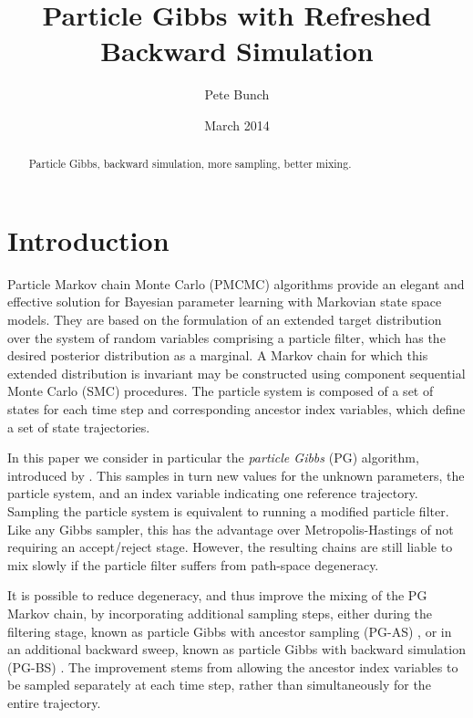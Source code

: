 \documentclass{article}
\title{Particle Gibbs with Refreshed Backward Simulation}
\author{Pete Bunch}
\date{March 2014}
\begin{document}
\maketitle

\begin{abstract}
 Particle Gibbs, backward simulation, more sampling, better mixing.
\end{abstract}


\section{Introduction}
Particle Markov chain Monte Carlo (PMCMC) algorithms \cite{Andrieu2010,Olsson2011,Chopin2013,Lindsten2014} provide an elegant and effective solution for Bayesian parameter learning with Markovian state space models. They are based on the formulation of an extended target distribution over the system of random variables comprising a particle filter, which has the desired posterior distribution as a marginal. A Markov chain for which this extended distribution is invariant may be constructed using component sequential Monte Carlo (SMC) procedures. The particle system is composed of a set of states for each time step and corresponding ancestor index variables, which define a set of state trajectories.

In this paper we consider in particular the \emph{particle Gibbs} (PG) algorithm, introduced by \cite{Andrieu2010}. This samples in turn new values for the unknown parameters, the particle system, and an index variable indicating one reference trajectory. Sampling the particle system is equivalent to running a modified particle filter. Like any Gibbs sampler, this has the advantage over Metropolis-Hastings of not requiring an accept/reject stage. However, the resulting chains are still liable to mix slowly if the particle filter suffers from path-space degeneracy.

It is possible to reduce degeneracy, and thus improve the mixing of the PG Markov chain, by incorporating additional sampling steps, either during the filtering stage, known as particle Gibbs with ancestor sampling (PG-AS) \cite{Lindsten2014}, or in an additional backward sweep, known as particle Gibbs with backward simulation (PG-BS) \cite{Whiteley2010b,Lindsten2012}. The improvement stems from allowing the ancestor index variables to be sampled separately at each time step, rather than simultaneously for the entire trajectory.
\end{document}
